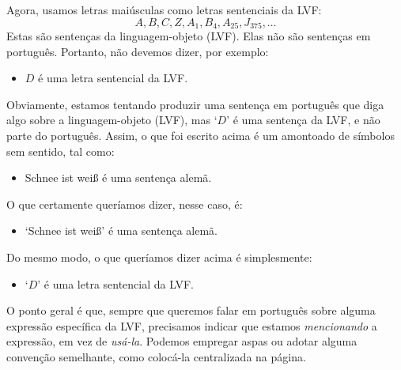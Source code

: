 Agora, usamos letras maiúsculas como letras sentenciais da LVF:
	$$A, B, C, Z, A_1, B_4, A_{25}, J_{375},\ldots$$
Estas são sentenças da linguagem-objeto (LVF). Elas não são sentenças em
português. Portanto, não devemos dizer, por exemplo:
	\begin{itemize}
		\item $D$ é uma letra sentencial da LVF.
	\end{itemize}
Obviamente, estamos tentando produzir uma sentença em português que diga
algo sobre a linguagem-objeto (LVF), mas `$D$' é uma sentença da LVF, e
não parte do português. Assim, o que foi escrito acima é um amontoado de
símbolos sem sentido, tal como:
	\begin{itemize}
		\item \foreignlanguage{german}{Schnee ist wei\ss} é uma sentença alemã.
	\end{itemize}
O que certamente queríamos dizer, nesse caso, é:
	\begin{itemize}
		\item `\foreignlanguage{german}{Schnee ist wei\ss}' é uma sentença alemã.
	\end{itemize}
Do mesmo modo, o que queríamos dizer acima é simplesmente:
	\begin{itemize}
		\item `$D$' é uma letra sentencial da LVF.
	\end{itemize}
O ponto geral é que, sempre que queremos falar em português sobre alguma
expressão específica da LVF, precisamos indicar que estamos
\emph{mencionando} a expressão, em vez de \emph{usá-la}. Podemos empregar
aspas ou adotar alguma convenção semelhante, como colocá-la centralizada
na página.


